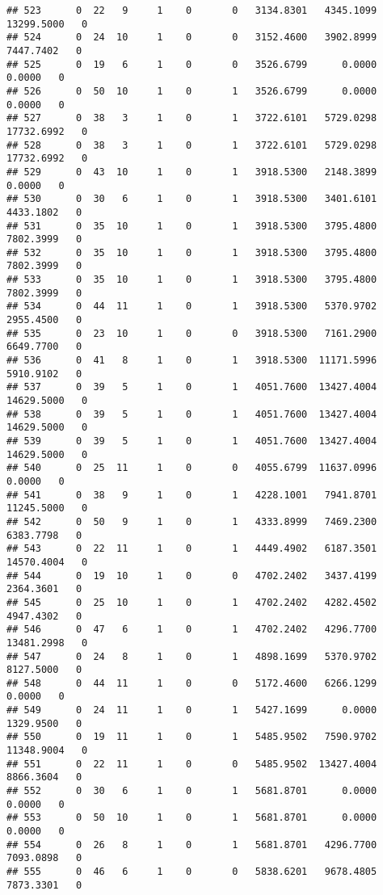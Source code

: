 \documentclass[
]{article}
\begin{document}
\begin{enumerate}
\begin{verbatim}
## 523      0  22   9     1    0       0   3134.8301   4345.1099  13299.5000   0
## 524      0  24  10     1    0       0   3152.4600   3902.8999   7447.7402   0
## 525      0  19   6     1    0       0   3526.6799      0.0000      0.0000   0
## 526      0  50  10     1    0       1   3526.6799      0.0000      0.0000   0
## 527      0  38   3     1    0       1   3722.6101   5729.0298  17732.6992   0
## 528      0  38   3     1    0       1   3722.6101   5729.0298  17732.6992   0
## 529      0  43  10     1    0       1   3918.5300   2148.3899      0.0000   0
## 530      0  30   6     1    0       1   3918.5300   3401.6101   4433.1802   0
## 531      0  35  10     1    0       1   3918.5300   3795.4800   7802.3999   0
## 532      0  35  10     1    0       1   3918.5300   3795.4800   7802.3999   0
## 533      0  35  10     1    0       1   3918.5300   3795.4800   7802.3999   0
## 534      0  44  11     1    0       1   3918.5300   5370.9702   2955.4500   0
## 535      0  23  10     1    0       0   3918.5300   7161.2900   6649.7700   0
## 536      0  41   8     1    0       1   3918.5300  11171.5996   5910.9102   0
## 537      0  39   5     1    0       1   4051.7600  13427.4004  14629.5000   0
## 538      0  39   5     1    0       1   4051.7600  13427.4004  14629.5000   0
## 539      0  39   5     1    0       1   4051.7600  13427.4004  14629.5000   0
## 540      0  25  11     1    0       0   4055.6799  11637.0996      0.0000   0
## 541      0  38   9     1    0       1   4228.1001   7941.8701  11245.5000   0
## 542      0  50   9     1    0       1   4333.8999   7469.2300   6383.7798   0
## 543      0  22  11     1    0       1   4449.4902   6187.3501  14570.4004   0
## 544      0  19  10     1    0       0   4702.2402   3437.4199   2364.3601   0
## 545      0  25  10     1    0       1   4702.2402   4282.4502   4947.4302   0
## 546      0  47   6     1    0       1   4702.2402   4296.7700  13481.2998   0
## 547      0  24   8     1    0       1   4898.1699   5370.9702   8127.5000   0
## 548      0  44  11     1    0       0   5172.4600   6266.1299      0.0000   0
## 549      0  24  11     1    0       1   5427.1699      0.0000   1329.9500   0
## 550      0  19  11     1    0       1   5485.9502   7590.9702  11348.9004   0
## 551      0  22  11     1    0       0   5485.9502  13427.4004   8866.3604   0
## 552      0  30   6     1    0       1   5681.8701      0.0000      0.0000   0
## 553      0  50  10     1    0       1   5681.8701      0.0000      0.0000   0
## 554      0  26   8     1    0       1   5681.8701   4296.7700   7093.0898   0
## 555      0  46   6     1    0       0   5838.6201   9678.4805   7873.3301   0

\end{verbatim}
\end{enumerate}
\end{document}
